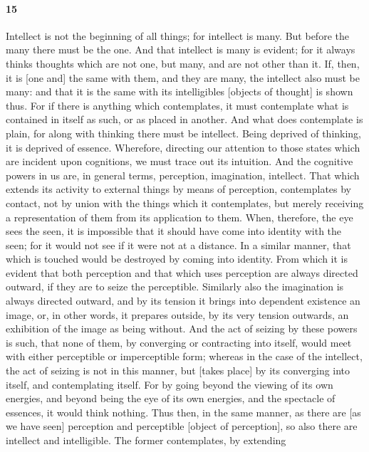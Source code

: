 \documentclass[12pt]{article}
\begin{document}
\paragraph{15} Intellect is not the beginning of all things; for intellect is
many. But before the many there must be the one. And that intellect is many is
evident; for it always thinks thoughts which are not one, but many, and are not
other than it. If, then, it is [one and] the same with them, and they are many,
the intellect also must be many: and that it is the same with its intelligibles
[objects of thought] is shown thus. For if there is anything which
contemplates, it must contemplate what is contained in itself as such, or as
placed in another. And what does contemplate is plain, for along with thinking
there must be intellect. Being deprived of thinking, it is deprived of
es\-sence. Wherefore, directing our attention to those states which are
incident upon cognitions, we must trace out its intuition. And the cognitive
powers in us are, in general terms, perception, imagination, intellect. That
which extends its activity to external things by means of perception,
contemplates by contact, not by union with the things which it contemplates,
but merely receiving a representation of them from its application to them.
When, therefore, the eye sees the seen, it is impossible that it should have
come into identity with the seen; for it would not see if it were not at a
distance. In a similar manner, that which is touched would be destroyed by
coming into identity. From which it is evident that both perception and that
which uses perception are always directed outward, if they are to seize the
perceptible. Similarly also the imagination is always directed outward, and by
its tension it brings into dependent existence an image, or, in other words, it
prepares outside, by its very tension outwards, an exhibition of the image as
being without. And the act of seizing by these powers is such, that none of
them, by converging or contracting into itself, would meet with either
perceptible or imperceptible form; whereas in the case of the intellect, the
act of seizing is not in this manner, but [takes place] by its converging into
itself, and contemplating itself. For by going beyond the viewing of its own
energies, and beyond being the eye of its own energies, and the spectacle of
es\-sences, it would think nothing. Thus then, in the same manner, as there are
[as we have seen] perception and perceptible [object of perception], so also
there are intellect and intelligible. The former contemplates, by extending
\end{document}
